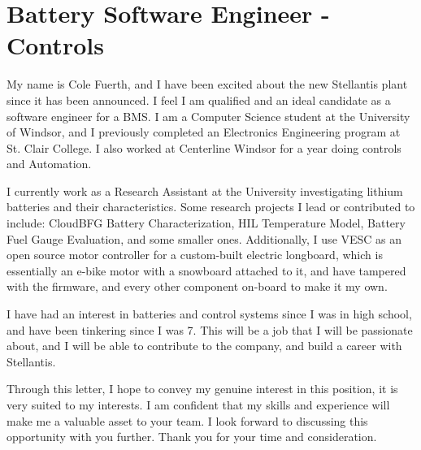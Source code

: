 \section{Battery Software Engineer - Controls}

My name is Cole Fuerth, and I have been excited about the new Stellantis plant since it has been announced. I feel I am qualified and an ideal candidate as a software engineer for a BMS. I am a Computer Science student at the University of Windsor, and I previously completed an Electronics Engineering program at St. Clair College. I also worked at Centerline Windsor for a year doing controls and Automation.

I currently work as a Research Assistant at the University investigating lithium batteries and their characteristics. Some research projects I lead or contributed to include: CloudBFG Battery Characterization, HIL Temperature Model, Battery Fuel Gauge Evaluation, and some smaller ones. Additionally, I use VESC as an open source motor controller for a custom-built electric longboard, which is essentially an e-bike motor with a snowboard attached to it, and have tampered with the firmware, and every other component on-board to make it my own.

I have had an interest in batteries and control systems since I was in high school, and have been tinkering since I was 7. This will be a job that I will be passionate about, and I will be able to contribute to the company, and build a career with Stellantis. 

Through this letter, I hope to convey my genuine interest in this position, it is very suited to my interests. I am confident that my skills and experience will make me a valuable asset to your team. I look forward to discussing this opportunity with you further. Thank you for your time and consideration.